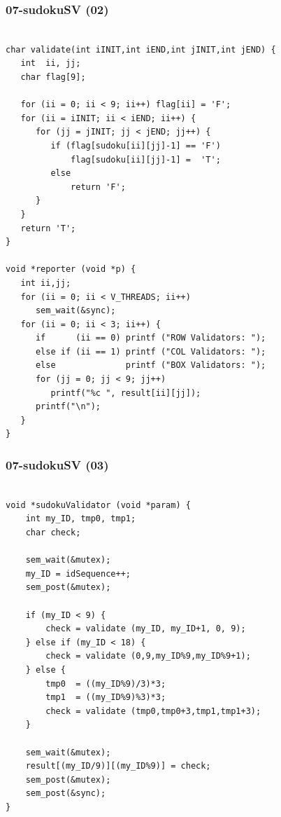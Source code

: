 \documentclass[xcolor=table, notheorems, hyperref={pdfpagelabels=false}]{beamer}
\begin{document}
\begin{frame}[fragile]
\frametitle{07-sudokuSV (02)}
\begin{lstlisting}[basicstyle=\ttfamily\tiny]

char validate(int iINIT,int iEND,int jINIT,int jEND) {
   int  ii, jj;
   char flag[9];

   for (ii = 0; ii < 9; ii++) flag[ii] = 'F';
   for (ii = iINIT; ii < iEND; ii++) {
      for (jj = jINIT; jj < jEND; jj++) {
         if (flag[sudoku[ii][jj]-1] == 'F')
             flag[sudoku[ii][jj]-1] =  'T';
         else
             return 'F';
      }
   }
   return 'T';
}

void *reporter (void *p) {
   int ii,jj;
   for (ii = 0; ii < V_THREADS; ii++)
      sem_wait(&sync);
   for (ii = 0; ii < 3; ii++) {
      if      (ii == 0) printf ("ROW Validators: ");
      else if (ii == 1) printf ("COL Validators: ");
      else              printf ("BOX Validators: "); 
      for (jj = 0; jj < 9; jj++)
         printf("%c ", result[ii][jj]);
      printf("\n");
   }
}

\end{lstlisting}
\end{frame}

\begin{frame}[fragile]
\frametitle{07-sudokuSV (03)}
\begin{lstlisting}[basicstyle=\ttfamily\tiny]

void *sudokuValidator (void *param) {       
    int my_ID, tmp0, tmp1;
    char check;

    sem_wait(&mutex);
    my_ID = idSequence++;
    sem_post(&mutex);

    if (my_ID < 9) {
        check = validate (my_ID, my_ID+1, 0, 9);
    } else if (my_ID < 18) {
        check = validate (0,9,my_ID%9,my_ID%9+1);
    } else {
        tmp0  = ((my_ID%9)/3)*3;
        tmp1  = ((my_ID%9)%3)*3;
        check = validate (tmp0,tmp0+3,tmp1,tmp1+3);
    }

    sem_wait(&mutex);
    result[(my_ID/9)][(my_ID%9)] = check;
    sem_post(&mutex);
    sem_post(&sync);
}

\end{lstlisting}
\end{frame}
\end{document}
